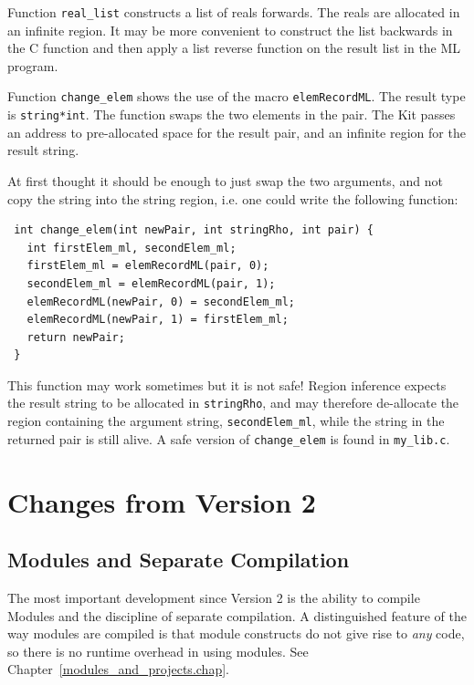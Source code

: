 \documentclass[12pt]{book}
\begin{document}
\begin{example}\label{real_list.ex}
  Function \texttt{real\_list} constructs a list
  of reals forwards. The reals are allocated in an infinite region. It
  may be more convenient to construct the list backwards in the C
  function and then apply a list reverse function on the result list
  in the ML program.
\end{example}

\begin{example}\label{change_elem.ex}
  Function \texttt{change\_elem} shows the use of
  the macro \texttt{elemRecordML}. The result type is \texttt{string*int}. The
  function swaps the two elements in the pair. The Kit passes an address to
  pre-allocated space for the result pair, and an infinite region for the
  result string.
  
  At first thought it should be enough to just swap the two arguments, and
  not copy the string into the string region, i.e. one could write the
  following function:
\begin{verbatim}
 int change_elem(int newPair, int stringRho, int pair) {
   int firstElem_ml, secondElem_ml;
   firstElem_ml = elemRecordML(pair, 0);
   secondElem_ml = elemRecordML(pair, 1);
   elemRecordML(newPair, 0) = secondElem_ml;
   elemRecordML(newPair, 1) = firstElem_ml;
   return newPair;
 }
\end{verbatim}
  This function may work sometimes but it is not safe! Region
  inference expects the result string to be allocated in
  \texttt{stringRho}, and may therefore de-allocate the region containing
  the argument string, \verb|secondElem_ml|, while the string in the
  returned pair is still alive. A safe version of \verb|change_elem| is
  found in \verb|my_lib.c|.
\end{example}

\chapter{Changes from Version 2}

\section{Modules and Separate Compilation}
The most important development since Version 2 is the
ability to compile Modules and the discipline of separate 
compilation. A distinguished feature of the way modules are
compiled is that module constructs do not give rise to 
{\em any} code, so there is no runtime overhead in using modules. See
Chapter~\ref{modules_and_projects.chap}.
\end{document}
